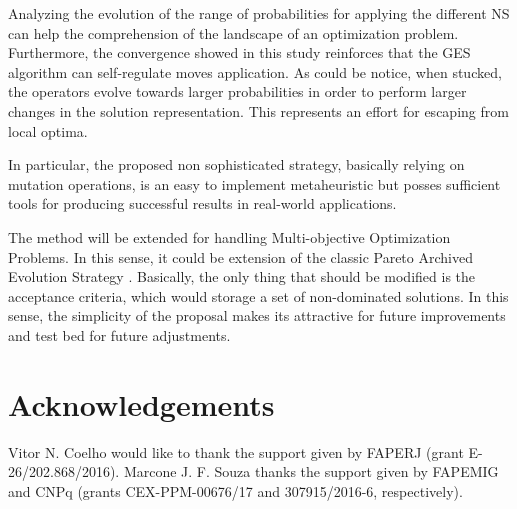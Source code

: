 \documentclass{endm}
\begin{document}
Analyzing the evolution of the range of probabilities for applying the different NS can help the comprehension of the landscape of an optimization problem.
Furthermore, the convergence showed in this study reinforces that the GES algorithm can self-regulate moves application.
As could be notice, when stucked, the operators evolve towards larger probabilities in order to perform larger changes in the solution representation.
This represents an effort for escaping from local optima.

In particular, the proposed non sophisticated strategy, basically relying on mutation operations, is an easy to implement metaheuristic but posses sufficient tools for producing successful results in real-world applications.

The method will be extended for handling Multi-objective Optimization Problems.
In this sense, it could be extension of the classic Pareto Archived Evolution Strategy \cite{knowles1999pareto}.
Basically, the only thing that should be modified is the acceptance criteria, which would storage a set of non-dominated solutions.
In this sense, the simplicity of the proposal makes its attractive for future improvements and test bed for future adjustments.

\vspace{-0.2cm}
\section*{Acknowledgements}
Vitor N. Coelho would like to thank the support given by FAPERJ (grant E-26/202.868/2016). Marcone J. F. Souza thanks the support given by FAPEMIG and CNPq (grants CEX-PPM-00676/17 and 307915/2016-6, respectively).

\vspace{-0.2cm}


\end{document}
